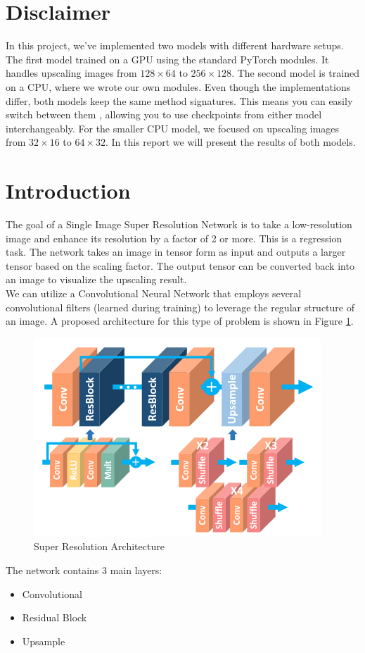 \documentclass[../report.tex]{subfiles}
\begin{document}
\section{Disclaimer}
In this project, we've implemented two models with different hardware setups. The first model trained on a GPU using the standard PyTorch modules. It handles upscaling images from $128 \times 64$ to $256 \times 128$.
The second model is trained on a CPU, where we wrote our own modules. Even though the implementations differ, both models keep the same method signatures. This means you can easily switch between them , allowing you to use checkpoints from either model interchangeably.
For the smaller CPU model, we focused on upscaling images from $32 \times 16$ to $64 \times 32$. 
In this report we will present the results of both models.
\section{Introduction}

The goal of a Single Image Super Resolution Network is to take a low-resolution image and enhance its resolution by a factor of 2 or more. This is a regression task. The network takes an image in tensor form as input and outputs a larger tensor based on the scaling factor. The output tensor can be converted back into an image to visualize the upscaling result.\\
We can utilize a Convolutional Neural Network that employs several convolutional filters (learned during training) to leverage the regular structure of an image. A proposed architecture for this type of problem is shown in Figure \ref{fig:SR_architecture}.
\begin{figure}[tb]
	\caption{Super Resolution Architecture}
	\centering
	\label{fig:SR_architecture}
	\includegraphics[scale=0.6]{../images/SISRN_Architecture.png}
\end{figure}
The network contains 3 main layers:
\begin{itemize}
	\item Convolutional
	\item Residual Block
	\item Upsample
\end{itemize}
\end{document}
